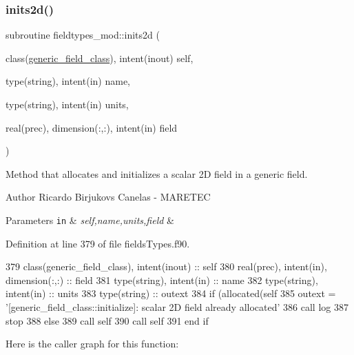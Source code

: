 \subsubsection{\texorpdfstring{inits2d()}{inits2d()}}
{\footnotesize\ttfamily subroutine fieldtypes\+\_\+mod\+::inits2d (\begin{DoxyParamCaption}\item[{class(\mbox{\hyperlink{structfieldtypes__mod_1_1generic__field__class}{generic\+\_\+field\+\_\+class}}), intent(inout)}]{self,  }\item[{type(string), intent(in)}]{name,  }\item[{type(string), intent(in)}]{units,  }\item[{real(prec), dimension(\+:,\+:), intent(in)}]{field }\end{DoxyParamCaption})\hspace{0.3cm}{\ttfamily [private]}}



Method that allocates and initializes a scalar 2D field in a generic field. 

\begin{DoxyAuthor}{Author}
Ricardo Birjukovs Canelas -\/ M\+A\+R\+E\+T\+EC 
\end{DoxyAuthor}

\begin{DoxyParams}[1]{Parameters}
\mbox{\tt in}  & {\em self,name,units,field} & \\
\hline
\end{DoxyParams}


Definition at line 379 of file fields\+Types.\+f90.


\begin{DoxyCode}
379     \textcolor{keywordtype}{class}(generic\_field\_class), \textcolor{keywordtype}{intent(inout)} :: self
380     \textcolor{keywordtype}{real(prec)}, \textcolor{keywordtype}{intent(in)}, \textcolor{keywordtype}{dimension(:,:)} :: field
381     \textcolor{keywordtype}{type}(string), \textcolor{keywordtype}{intent(in)} :: name
382     \textcolor{keywordtype}{type}(string), \textcolor{keywordtype}{intent(in)} :: units
383     \textcolor{keywordtype}{type}(string) :: outext
384     \textcolor{keywordflow}{if} (\textcolor{keyword}{allocated}(self%
385         outext = \textcolor{stringliteral}{'[generic\_field\_class::initialize]: scalar 2D field already allocated'}
386         \textcolor{keyword}{call }log%
387         stop
388     \textcolor{keywordflow}{else}
389         \textcolor{keyword}{call }self%
390         \textcolor{keyword}{call }self%
391 \textcolor{keywordflow}{    end if}
\end{DoxyCode}
Here is the caller graph for this function\+:
\mbox{\label{namespacefieldtypes__mod_a750ce2c729d98ea7031c839a3a5ebd7c}} 
